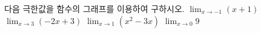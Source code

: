 다음 극한값을 함수의 그래프를 이용하여 구하시오.
 $\displaystyle\lim_{x\to -1}(x+1)$
 $\displaystyle\lim_{x\to 3}(-2x+3)$
 $\displaystyle\lim_{x\to 1}(x^2-3x)$
 $\displaystyle\lim_{x\to 0}9$
